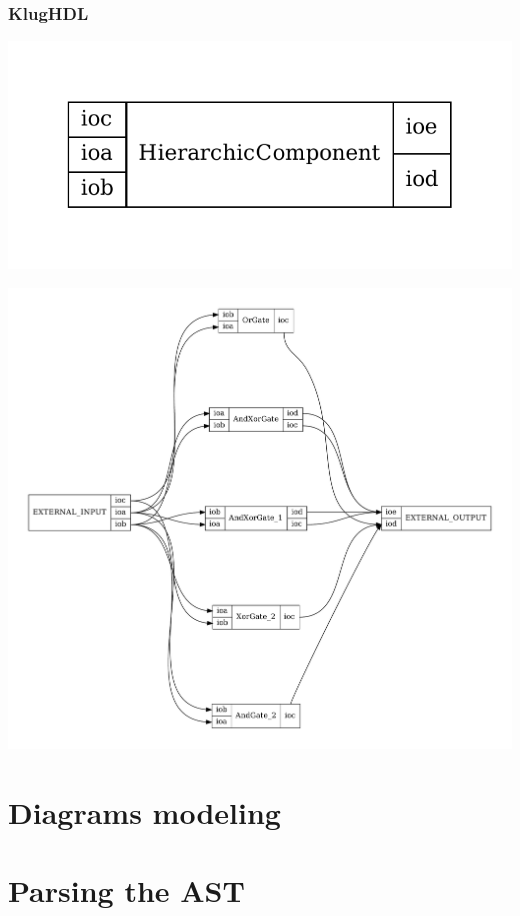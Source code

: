 \documentclass[11pt, handout]{beamer}
\begin{document}
\begin{frame}
  \frametitle{KlugHDL}
  \begin{minipage}{0.30\textwidth}
  \includegraphics[width=1.0\textwidth]{hierarchic_component}
  \end{minipage}
  \hfill
  \begin{minipage}{0.69\textwidth}
  \includegraphics[width=1.0\textwidth]{hierarchic_component_inside}
  \end{minipage}
\end{frame}

\section{Diagrams modeling}

\section{Parsing the AST}
\end{document}
